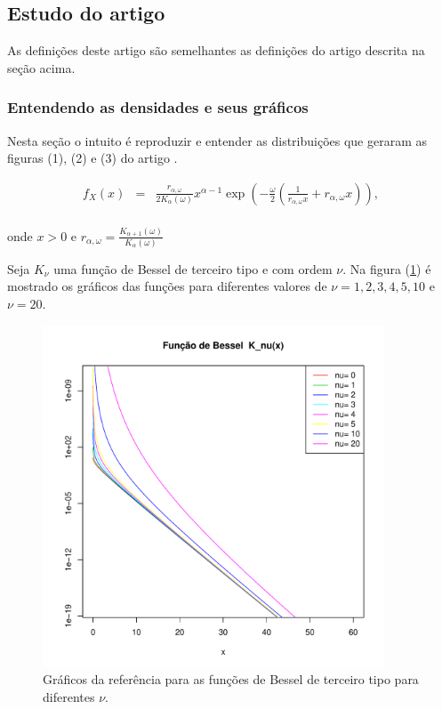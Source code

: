 \documentclass[12pt,a4paper]{article}
\begin{document}
\subsection{Estudo do artigo  \cite{freitas_frery_2005}}

As definições deste artigo são semelhantes as definições do artigo \cite{anfinsen2009} descrita na seção acima. 

\subsubsection{ Entendendo as densidades e seus gráficos}

Nesta seção o intuito é reproduzir e entender as distribuições que geraram as figuras (1), (2) e (3) do artigo \cite{freitas_frery_2005}. 

\begin{equation}\label{sec51eqn1}
\begin{array}{ccc}
	f_{X}(x)&=&\frac{r_{\alpha,\omega}}{2K_{\alpha}(\omega)}x^{\alpha-1}\exp\left(-\frac{\omega}{2}\left(\frac{1}{r_{\alpha,\omega}x}+ r_{\alpha,\omega}x\right)\right), \\
\end{array}
\end{equation}

onde $x>0$  e $r_{\alpha,\omega}=\frac{K_{\alpha+1}(\omega)}{K_{\alpha}(\omega)}$

Seja $K_{\nu}$ uma função de Bessel de terceiro tipo e com ordem $\nu$. Na figura (\ref{sec51fig1}) é mostrado os gráficos das funções para diferentes valores de $\nu=1,2,3,4,5,10$ e $\nu=20$. 
\begin{figure}[!htb]
\centering
\includegraphics[width=4.0in]{fun_bessel_nu.pdf}
	\caption{Gráficos da referência \cite{freitas_frery_2005} para as funções de Bessel de terceiro tipo para diferentes $\nu$.}
\label{sec51fig1}
\end{figure}
\end{document}
